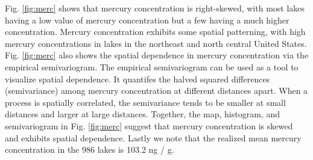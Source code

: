 \documentclass[]{elsarticle} %
\begin{document}
Fig. \ref{fig:merc} shows that mercury concentration is right-skewed,
with most lakes having a low value of mercury concentration but a few
having a much higher concentration. Mercury concentration exhibits some
spatial patterning, with high mercury concentrations in lakes in the
northeast and north central United States. Fig. \ref{fig:merc} also
shows the spatial dependence in mercury concentration via the empirical
semivariogram. The empirical semivariogram can be used as a tool to
visualize spatial dependence. It quantifes the halved squared
differences (semivariance) among mercury concentration at different
distances apart. When a process is spatially correlated, the
semivariance tends to be smaller at small distances and larger at large
distances. Together, the map, histogram, and semivariogram in Fig.
\ref{fig:merc} suggest that mercury concentration is skewed and exhibits
spatial dependence. Lastly we note that the realized mean mercury
concentration in the 986 lakes is 103.2 ng / g.
\end{document}
